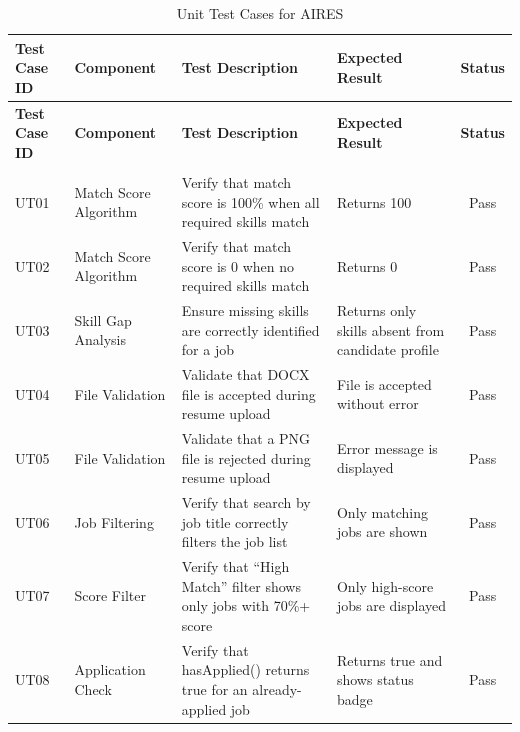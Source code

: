 \begin{longtable}{|p{1.5cm}|p{2.5cm}|p{4cm}|p{4cm}|c|}
    
    \hline
    \textbf{Test Case ID} & \textbf{Component} & \textbf{Test Description} & \textbf{Expected Result} & \textbf{Status} \\
    \hline
    \endfirsthead

    \hline
    \textbf{Test Case ID} & \textbf{Component} & \textbf{Test Description} & \textbf{Expected Result} & \textbf{Status} \\
    \hline
    \endhead

    \hline
    
    \endfoot

    \hline
    \caption{Unit Test Cases for AIRES} \label{tab:unit_tests} \\
    \endlastfoot

    UT01 & Match Score Algorithm & \raggedright Verify that match score is 100\% when all required skills match & \raggedright Returns 100 & Pass \\
    \hline
    UT02 & Match Score Algorithm & \raggedright Verify that match score is 0 when no required skills match & \raggedright Returns 0 & Pass \\
    \hline
    UT03 & Skill Gap Analysis & \raggedright Ensure missing skills are correctly identified for a job & \raggedright Returns only skills absent from candidate profile & Pass \\
    \hline
    UT04 & File Validation & \raggedright Validate that DOCX file is accepted during resume upload & \raggedright File is accepted without error & Pass \\
    \hline
    UT05 & File Validation & \raggedright Validate that a PNG file is rejected during resume upload & \raggedright Error message is displayed & Pass \\
    \hline
    UT06 & Job Filtering & \raggedright Verify that search by job title correctly filters the job list & \raggedright Only matching jobs are shown & Pass \\
    \hline
    UT07 & Score Filter & \raggedright Verify that ``High Match'' filter shows only jobs with 70\%+ score & \raggedright Only high-score jobs are displayed & Pass \\
    \hline
    UT08 & Application Check & \raggedright Verify that hasApplied() returns true for an already-applied job & \raggedright Returns true and shows status badge & Pass \\
    \end{longtable}




